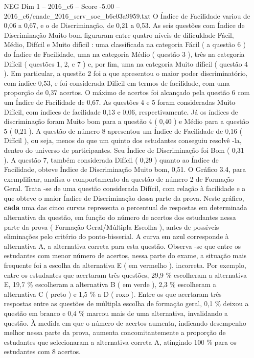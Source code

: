 \begin{textsample}{NEG Dim 1 – 2016\_c6 – Score -5.00 – 2016\_c6/enade\_2016\_serv\_soc\_b6e03a9959.txt}
O Índice de Facilidade variou de 0,06 a 0,67, e o de Discriminação, de 0,21 a 0,53.
As seis questões com Índice de Discriminação Muito bom figuraram entre quatro níveis de dificuldade Fácil, Médio, Difícil e Muito difícil : uma classificada na categoria Fácil ( a questão 6 ) do Índice de Facilidade, uma na categoria Médio ( questão 3 ), três na categoria Difícil ( questões 1, 2, e 7 ) e, por fim, uma na categoria Muito difícil ( questão 4 ).
Em particular, a questão 2 foi a que apresentou o maior poder discriminatório, com índice 0,53, e foi considerada Difícil em termos de facilidade, com uma proporção de 0,37 acertos.
O máximo de acertos foi alcançado pela questão 6 com um Índice de Facilidade de 0,67.
As questões 4 e 5 foram consideradas Muito Difícil, com índices de facilidade 0,13 e 0,06, respectivamente.
Já os índices de discriminação foram Muito bom para a questão 4 ( 0,40 ) e Médio para a questão 5 ( 0,21 ).
A questão de número 8 apresentou um Índice de Facilidade de 0,16 ( Difícil ), ou seja, menos do que um quinto dos estudantes conseguiu resolvê -la, dentro do universo de participantes.
Seu Índice de Discriminação foi Bom ( 0,31 ).
A questão 7, também considerada Difícil ( 0,29 ) quanto ao Índice de Facilidade, obteve Índice de Discriminação Muito bom, 0,51.
O Gráfico 3.4, para exemplificar, analisa o comportamento da questão de número 2 de Formação Geral.
Trata -se de uma questão considerada Difícil, com relação à facilidade e a que obteve o maior Índice de Discriminação dessa parte da prova.
Neste gráfico, \textbf{cada} uma das cinco curvas representa o percentual de respostas em determinada alternativa da questão, em função do número de acertos dos estudantes nessa parte da prova ( Formação Geral/Múltipla Escolha ), antes de possíveis eliminações pelo critério do ponto-bisserial.
A curva em azul corresponde à alternativa A, a alternativa correta para esta questão.
Observa -se que entre os estudantes com menor número de acertos, nessa parte do exame, a situação mais frequente foi a escolha da alternativa E ( em vermelho ), incorreta.
Por exemplo, entre os estudantes que acertaram três questões, 29,9 \% escolheram a alternativa E, 19,7 \% escolheram a alternativa B ( em verde ), 2,3 \% escolheram a alternativa C ( preto ) e 1,5 \% a D ( roxo ).
Entre os que acertaram três respostas entre as questões de múltipla escolha de formação geral, 0,1 \% deixou a questão em branco e 0,4 \% marcou mais de uma alternativa, invalidando a questão.
À medida em que o número de acertos aumenta, indicando desempenho melhor nessa parte da prova, aumenta concomitantemente a proporção de estudantes que selecionaram a alternativa correta A, atingindo 100 \% para os estudantes com 8 acertos.

\end{textsample}
